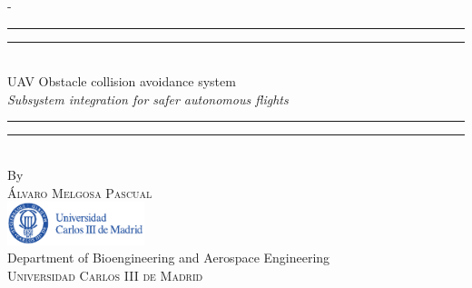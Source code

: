 %
%
% 
%
%
\begin{titlingpage}
\begin{SingleSpace}
\calccentering{\unitlength} 
\begin{adjustwidth*}{\unitlength}{-\unitlength}
\vspace*{13mm}
\begin{center}
\rule[0.5ex]{\linewidth}{2pt}\vspace*{-\baselineskip}\vspace*{3.2pt}
\rule[0.5ex]{\linewidth}{1pt}\\[\baselineskip]
{\HUGE UAV Obstacle collision avoidance system }\\[4mm]
{\Large \textit{ Subsystem integration for safer autonomous flights }}\\
\rule[0.5ex]{\linewidth}{1pt}\vspace*{-\baselineskip}\vspace{3.2pt}
\rule[0.5ex]{\linewidth}{2pt}\\
\vspace{1cm}
{\large By}\\
\vspace{0.5cm}
{\large\textsc{\'Alvaro Melgosa Pascual}}\\
\vspace{2cm}
\includegraphics[trim={0 0 2.13cm 0},clip, width=0.3\textwidth]{logos/logoUC3M}\\
\vspace{1cm}
{\large Department of Bioengineering and Aerospace Engineering\\
\textsc{Universidad Carlos III de Madrid}}\\

\end{center}
\end{adjustwidth*}
\end{SingleSpace}
\end{titlingpage}
